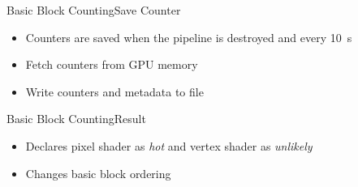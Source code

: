 \documentclass[xcolor={usenames,dvipsnames}, aspectratio=169, 12pt]{beamer}
\begin{document}





{
\begin{frame}{Basic Block Counting}{Save Counter}
\begin{itemize}
	\item Counters are saved when the pipeline is destroyed and every \SI{10}{\second}
	\item Fetch counters from GPU memory
	\item Write counters and metadata to file
\end{itemize}
\end{frame}}

{\framelogo{\centering}
\begin{frame}{Basic Block Counting}{Result}
\begin{itemize}
	\item Declares pixel shader as \emph{hot} and vertex shader as \emph{unlikely}
	\item Changes basic block ordering
\end{itemize}
\end{frame}}
\end{document}

